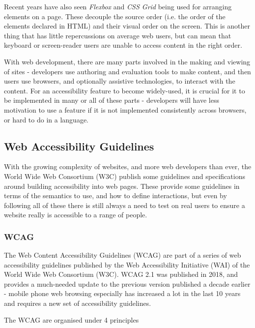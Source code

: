 \documentclass[ %
                    author={Aleena Baig},
                supervisor={Dr Simon Lock},
                    degree={BSc},
                     title={On Making Web Accessible Graphs},
                  subtitle={},
                      year={2019} ]{dissertation}
\begin{document}
Recent years have also seen \textit{Flexbox} and \textit{CSS Grid} being used for arranging elements on a page. These decouple the source order (i.e. the order of the elements declared in HTML) and their visual order on the screen. This is another thing that has little repercussions on average web users, but can mean that keyboard or screen-reader users are unable to access content in the right order.


With web development, there are many parts involved in the making and viewing of sites \cite{w3components} - developers use authoring and evaluation tools to make content, and then users use browsers, and optionally assistive technologies, to interact with the content. For an accessibility feature to become widely-used, it is crucial for it to be implemented in many or all of these parts - developers will have less motivation to use a feature if it is not implemented consistently across browsers, or hard to do in a language.


\subsection{Web Accessibility Guidelines}
With the growing complexity of websites, and more web developers than ever, the World Wide Web Consortium (W3C) publish some guidelines and specifications around building accessibility into web pages.
These provide some guidelines in terms of the semantics to use, and how to define interactions, but even by following all of these there is still always a need to test on real users to ensure a website really is accessible to a range of people.

\subsubsection{WCAG}

The Web Content Accessibility Guidelines (WCAG) are part of a series of web accessibility guidelines published by the Web Accessibility Initiative (WAI) of the World Wide Web Consortium (W3C). WCAG 2.1 was published in 2018, and provides a much-needed update to the previous version published a decade earlier - mobile phone web browsing especially has increased a lot in the last 10 years and requires a new set of accessibility guidelines.

The WCAG are organised under 4 principles
\end{document}
